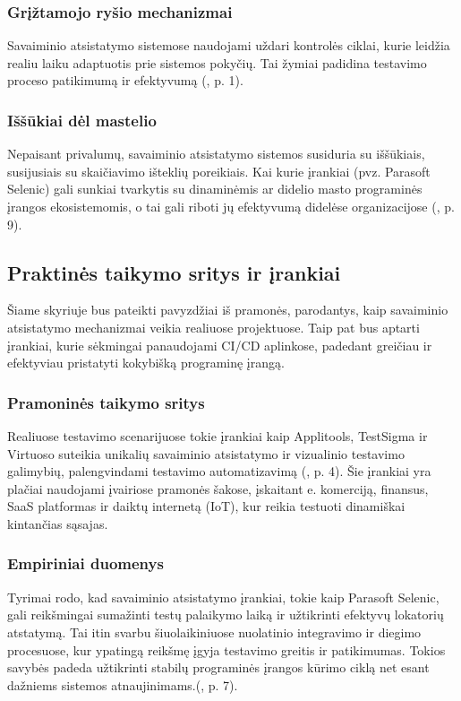 \documentclass[
]{VUMIFPSkursinis}
\begin{document}
\subsubsection{Grįžtamojo ryšio mechanizmai}
Savaiminio atsistatymo sistemose naudojami uždari kontrolės ciklai, kurie leidžia realiu laiku adaptuotis prie sistemos pokyčių. Tai žymiai padidina testavimo proceso patikimumą ir efektyvumą (\cite{Schneider2013}, p. 1).
\subsubsection{Iššūkiai dėl mastelio}
Nepaisant privalumų, savaiminio atsistatymo sistemos susiduria su iššūkiais, susijusiais su skaičiavimo išteklių poreikiais. Kai kurie įrankiai (pvz. Parasoft Selenic) gali sunkiai tvarkytis su dinaminėmis ar didelio masto programinės įrangos ekosistemomis, o tai gali riboti jų efektyvumą didelėse organizacijose (\cite{Garousi2024}, p. 9).

\subsection{Praktinės taikymo sritys ir įrankiai}

Šiame skyriuje bus pateikti pavyzdžiai iš pramonės, parodantys, kaip savaiminio atsistatymo mechanizmai veikia realiuose projektuose. Taip pat bus aptarti įrankiai, kurie sėkmingai panaudojami CI/CD aplinkose, padedant greičiau ir efektyviau pristatyti kokybišką programinę įrangą.

\subsubsection{Pramoninės taikymo sritys}
Realiuose testavimo scenarijuose tokie įrankiai kaip Applitools, TestSigma ir Virtuoso suteikia unikalių savaiminio atsistatymo ir vizualinio testavimo galimybių, palengvindami testavimo automatizavimą (\cite{Garousi2024}, p. 4). Šie įrankiai yra plačiai naudojami įvairiose pramonės šakose, įskaitant e. komerciją, finansus, SaaS platformas ir daiktų internetą (IoT), kur reikia testuoti dinamiškai kintančias sąsajas.
\subsubsection{Empiriniai duomenys}
Tyrimai rodo, kad savaiminio atsistatymo įrankiai, tokie kaip Parasoft Selenic, gali reikšmingai sumažinti testų palaikymo laiką ir užtikrinti efektyvų lokatorių atstatymą. Tai itin svarbu šiuolaikiniuose nuolatinio integravimo ir diegimo procesuose, kur ypatingą reikšmę įgyja testavimo greitis ir patikimumas. Tokios savybės padeda užtikrinti stabilų programinės įrangos kūrimo ciklą net esant dažniems sistemos atnaujinimams.(\cite{Garousi2024}, p. 7).
\end{document}
